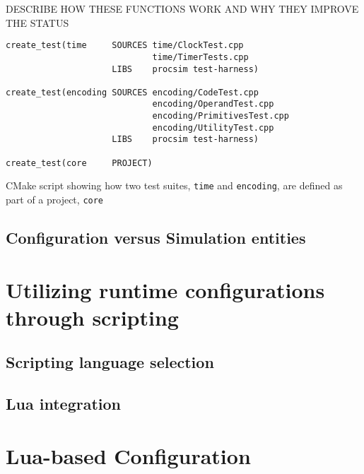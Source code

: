 DESCRIBE HOW THESE FUNCTIONS WORK AND WHY THEY IMPROVE THE STATUS

\begin{listing}[hb]
\begin{verbatim}
create_test(time     SOURCES time/ClockTest.cpp 
                             time/TimerTests.cpp
                     LIBS    procsim test-harness)
                     
create_test(encoding SOURCES encoding/CodeTest.cpp
                             encoding/OperandTest.cpp
                             encoding/PrimitivesTest.cpp
                             encoding/UtilityTest.cpp
                     LIBS    procsim test-harness)
                     
create_test(core     PROJECT)
\end{verbatim}
\caption{CMake script showing how two test suites, \texttt{time} and \texttt{encoding}, are defined as part of a project, \texttt{core}}
\label{lst:lua:cmake-test-declaration}
\end{listing}
 


\subsection{Configuration versus Simulation entities}
\lipsum[1]

\section{Utilizing runtime configurations through scripting}
\lipsum[1]

\subsection{Scripting language selection}
\lipsum[1]


\subsection{Lua integration}
\lipsum[1]

\section{Lua-based Configuration}

